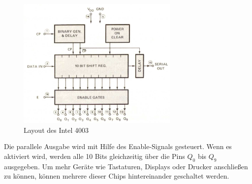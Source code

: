  \begin{figure}[H]
 	\centering
 	\includegraphics[width=0.7\textwidth]{figures/layout_4003.png}
 	\caption{Layout des Intel 4003}
 	\label{fig:layout_4003}
 \end{figure}
 
Die parallele Ausgabe wird mit Hilfe des Enable-Signals gesteuert. 
Wenn es aktiviert wird, werden alle 10 Bits gleichzeitig über die Pins $Q_0$ bis $Q_9$ ausgegeben. Um mehr Geräte wie Tastaturen, Displays oder Drucker anschließen zu können, können mehrere dieser Chips hintereinander geschaltet werden.

